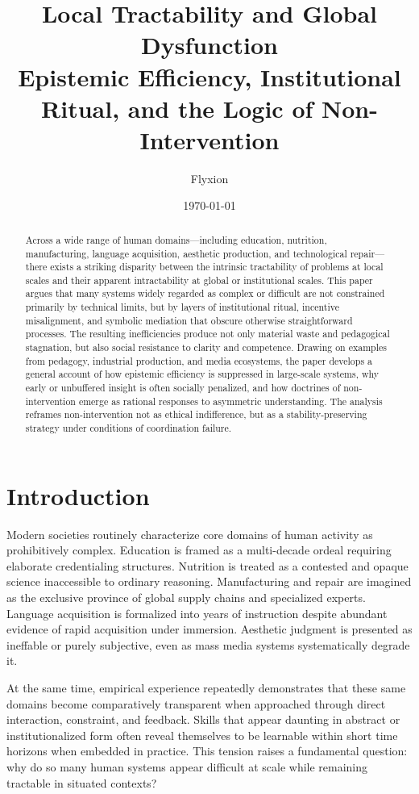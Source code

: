 \documentclass[12pt]{article}
\title{Local Tractability and Global Dysfunction\\
Epistemic Efficiency, Institutional Ritual, and the Logic of Non-Intervention}
\author{Flyxion}
\date{\today}
\begin{document}
\maketitle

\begin{abstract}
Across a wide range of human domains---including education, nutrition, manufacturing, language acquisition, aesthetic production, and technological repair---there exists a striking disparity between the intrinsic tractability of problems at local scales and their apparent intractability at global or institutional scales. This paper argues that many systems widely regarded as complex or difficult are not constrained primarily by technical limits, but by layers of institutional ritual, incentive misalignment, and symbolic mediation that obscure otherwise straightforward processes. The resulting inefficiencies produce not only material waste and pedagogical stagnation, but also social resistance to clarity and competence. Drawing on examples from pedagogy, industrial production, and media ecosystems, the paper develops a general account of how epistemic efficiency is suppressed in large-scale systems, why early or unbuffered insight is often socially penalized, and how doctrines of non-intervention emerge as rational responses to asymmetric understanding. The analysis reframes non-intervention not as ethical indifference, but as a stability-preserving strategy under conditions of coordination failure.
\end{abstract}

\newpage
\section{Introduction}

Modern societies routinely characterize core domains of human activity as prohibitively complex. Education is framed as a multi-decade ordeal requiring elaborate credentialing structures. Nutrition is treated as a contested and opaque science inaccessible to ordinary reasoning. Manufacturing and repair are imagined as the exclusive province of global supply chains and specialized experts. Language acquisition is formalized into years of instruction despite abundant evidence of rapid acquisition under immersion. Aesthetic judgment is presented as ineffable or purely subjective, even as mass media systems systematically degrade it.

At the same time, empirical experience repeatedly demonstrates that these same domains become comparatively transparent when approached through direct interaction, constraint, and feedback. Skills that appear daunting in abstract or institutionalized form often reveal themselves to be learnable within short time horizons when embedded in practice. This tension raises a fundamental question: why do so many human systems appear difficult at scale while remaining tractable in situated contexts?
\end{document}
